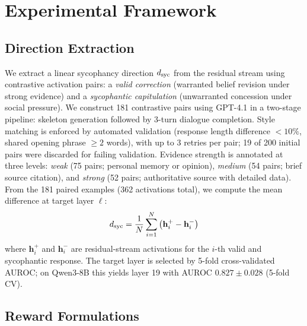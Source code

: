 \section{Experimental Framework}
\label{sec:framework}

\subsection{Direction Extraction}
\label{ssec:extraction}

We extract a linear sycophancy direction $d_{\text{syc}}$ from the residual stream using contrastive activation pairs: a \emph{valid correction} (warranted belief revision under strong evidence) and a \emph{sycophantic capitulation} (unwarranted concession under social pressure).
We construct 181 contrastive pairs using GPT-4.1 \citep{openai2025gpt41} in a two-stage pipeline: skeleton generation followed by 3-turn dialogue completion.
Style matching is enforced by automated validation (response length difference ${<}10\%$, shared opening phrase ${\geq}2$ words), with up to 3 retries per pair; 19 of 200 initial pairs were discarded for failing validation.
Evidence strength is annotated at three levels: \emph{weak} (75 pairs; personal memory or opinion), \emph{medium} (54 pairs; brief source citation), and \emph{strong} (52 pairs; authoritative source with detailed data).
From the 181 paired examples (362 activations total), we compute the mean difference at target layer $\ell$:
\begin{equation}
\label{eq:dsyc}
d_{\text{syc}} = \frac{1}{N}\sum_{i=1}^{N}\left(\mathbf{h}^{+}_i - \mathbf{h}^{-}_i\right)
\end{equation}
where $\mathbf{h}^{+}_i$ and $\mathbf{h}^{-}_i$ are residual-stream activations for the $i$-th valid and sycophantic response.
The target layer is selected by 5-fold cross-validated AUROC; on Qwen3-8B this yields layer 19 with AUROC $0.827 \pm 0.028$ (5-fold CV).

\subsection{Reward Formulations}
\label{ssec:reward}

